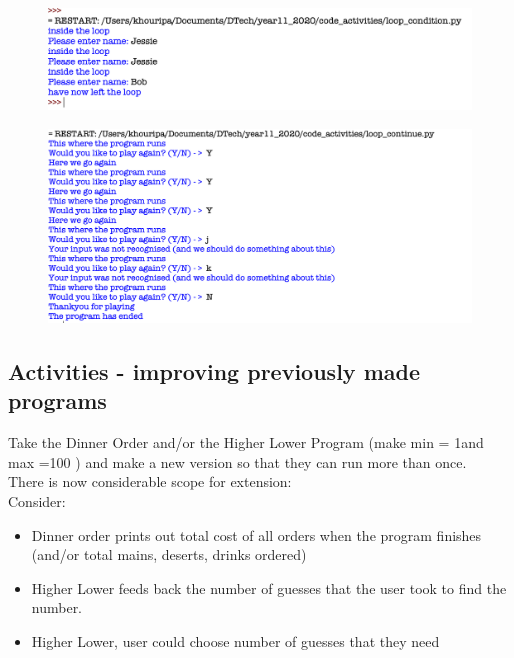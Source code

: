 \documentclass[a4paper,12pt]{article}
\begin{document}

\begin{figure} [!h]
	\centering
	\includegraphics[width=17cm]{screen_shots/loop_condition.png}
\end{figure}
\newpage

\begin{figure} [!h]
	\centering
	\includegraphics[width=17cm]{screen_shots/loop_continue.png}
\end{figure}
\newpage
\subsection{Activities - improving previously made programs}
Take the Dinner Order and/or the Higher Lower Program (make min = 1and max =100 ) and make a new version so that they can run more than once.\\
There is now considerable scope  for extension:\\
Consider:
\begin{itemize}
\item Dinner order prints out total cost of all orders when the program finishes (and/or total mains, deserts, drinks ordered)
\item Higher Lower feeds back the number of guesses that the user took to find the number. 
\item Higher Lower, user could choose number of guesses that they need
\end{itemize}
\end{document}
